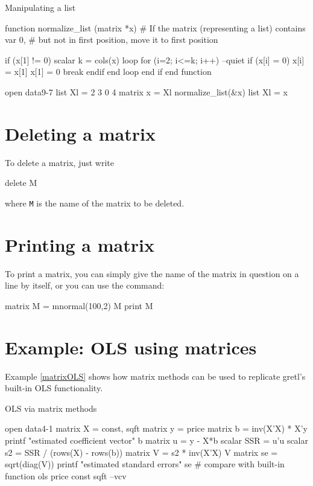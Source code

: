 \begin{script}[htbp]
  \caption{Manipulating a list}
  \label{normalize-list}
\begin{scode}
function normalize_list (matrix *x)
  # If the matrix (representing a list) contains var 0,
  # but not in first position, move it to first position

  if (x[1] != 0)
     scalar k = cols(x)
     loop for (i=2; i<=k; i++) --quiet
        if (x[i] = 0)
            x[i] = x[1]
            x[1] = 0
            break
         endif
     end loop
  end if
end function

open data9-7
list Xl = 2 3 0 4
matrix x = Xl
normalize_list(&x)
list Xl = x
\end{scode}
\end{script}


\section{Deleting a matrix}
\label{matrix-delete}

To delete a matrix, just write
%
\begin{code}
delete M
\end{code}
%
where \texttt{M} is the name of the matrix to be deleted.

\section{Printing a matrix}

To print a matrix, you can simply give the name of the matrix in
question on a line by itself, or you can use the  command:
%
\begin{code}
matrix M = mnormal(100,2)
M
print M
\end{code}

\section{Example: OLS using matrices}
\label{matrix-example}

Example \ref{matrixOLS} shows how matrix methods can be used to
replicate gretl's built-in OLS functionality.

\begin{script}[htbp]
  \caption{OLS via matrix methods}
  \label{matrixOLS}
\begin{scode}
open data4-1
matrix X = { const, sqft }
matrix y = { price }
matrix b = inv(X'X) * X'y
printf "estimated coefficient vector\n"
b
matrix u = y - X*b
scalar SSR = u'u
scalar s2 = SSR / (rows(X) - rows(b))
matrix V = s2 * inv(X'X)
V
matrix se = sqrt(diag(V))
printf "estimated standard errors\n"
se
# compare with built-in function
ols price const sqft --vcv
\end{scode}
\end{script}
\clearpage

